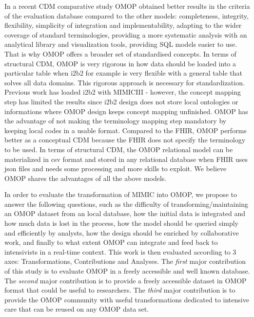 In a recent CDM comparative study \cite{cdm-review,omop-vs-pcornet}
OMOP obtained better results in the criteria of the evaluation database 
compared to the other models: completeness, integrity, flexibility, simplicity 
of integration and implementability, adapting to the wider coverage 
of standard terminologies, providing a more systematic analysis 
with an analytical library and visualization tools, providing SQL models easier to use.
That is why OMOP offers a broader set of standardised concepts.
In terms of structural CDM, OMOP is very rigorous in how data should be loaded 
into a particular table when i2b2 for example is very flexible 
with a general table that solves all data domains. This rigorous approach 
is necessary for standardization. 
Previous work has loaded i2b2 with MIMICIII \cite{mimic-i2b2} - 
however, the concept mapping step has limited the results since i2b2 design 
does not store local ontologies or informations where OMOP design keeps 
concept mapping unfinished. OMOP has the advantage of not making the terminology 
mapping step mandatory by keeping local codes in a usable format. 
Compared to the FHIR, OMOP performs better as a conceptual CDM because 
the FHIR does not specify the terminology to be used. In terms of structural CDM, 
the OMOP relational model can be materialized in csv format
 and stored in any relational database when FHIR uses json files and 
needs some processing and more skills to exploit.
We believe OMOP shares the advantages of all the above models.

In order to evaluate the transformation of MIMIC into OMOP, 
we propose to answer the following questions, 
such as the difficulty of transforming/maintaining an OMOP dataset 
from an local database, how the initial data is integrated 
and how much data is lost in the process, how the model should be queried simply 
and efficiently by analysts, how the design should be enriched by collaborative work, 
and finally to what extent OMOP can integrate and feed back to intensivists 
in a real-time context. This work is then evaluated according to 3 axes: 
Transformations, Contributions and Analyses. 
The \emph{first} major contribution of this study is to evaluate OMOP in a freely 
accessible and well known database. The \emph{second} major contribution is to provide 
a freely accessible dataset in OMOP format that could be useful to researchers. 
The \emph{third} major contribution is to provide the OMOP community with useful 
transformations dedicated to intensive care that can be reused on any OMOP data set.
